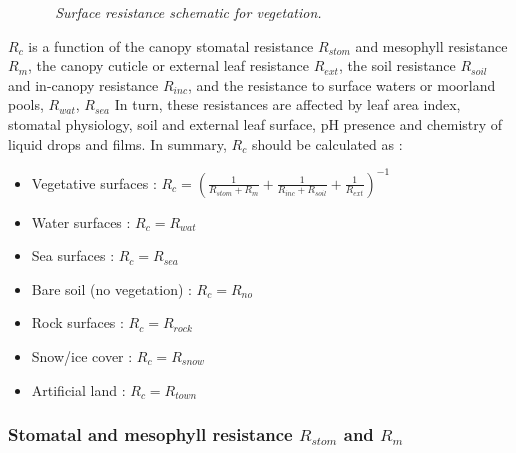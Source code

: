 \begin{figure}[htb]
\centerline{}
\caption{\sl ~{Surface resistance schematic for vegetation.}}
\label{schema2}
\end{figure}
$R_c$ is a function of the canopy stomatal resistance $R_{stom}$ and mesophyll
resistance $R_m$, the canopy cuticle or external leaf resistance $R_{ext}$, the
soil resistance $R_{soil}$ and in-canopy resistance $R_{inc}$, 
and the resistance
to surface waters or moorland pools, $R_{wat}$, $R_{sea}$ \citep{Erisman1994}
In turn, these resistances are affected by leaf area index, stomatal
physiology, soil and external leaf surface, pH presence and chemistry of
liquid drops and films.
In summary, $R_c$ should be calculated as \cite{Erisman1994}:
\begin{itemize}
\item Vegetative surfaces :
$
R_c= \left(\frac{1}{R_{stom}+R_m}+\frac{1}{R_{inc}+R_{soil}} + \frac{1}{R_{ext}} \right)^{-1} 
$
\item Water surfaces : $R_c=R_{wat}$
\item Sea surfaces : $R_c=R_{sea}$ 
\item Bare soil (no vegetation) : $R_c=R_{no}$
\item Rock surfaces : $R_c=R_{rock}$
\item Snow/ice  cover : $R_c=R_{snow}$
\item Artificial land : $R_c=R_{town}$

\end{itemize}
\subsubsection*{Stomatal and mesophyll resistance $R_{stom}$ and $R_m$}

